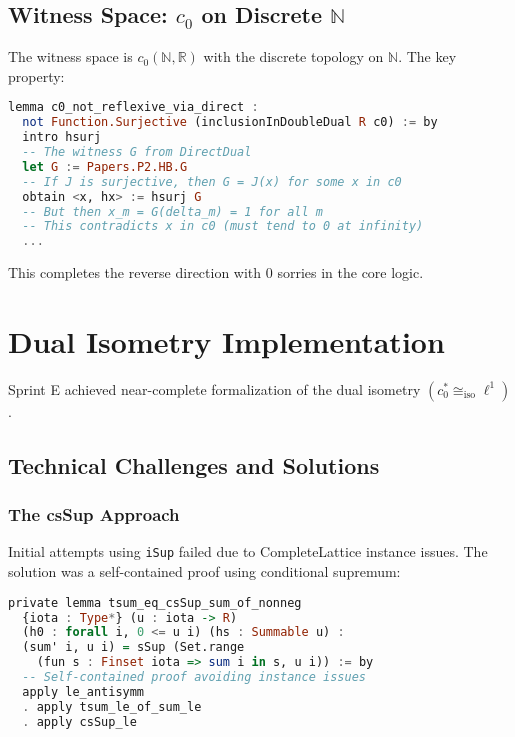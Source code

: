 \documentclass{lmcs}
\begin{document}
\subsection{Witness Space: $c_0$ on Discrete $\mathbb{N}$}

The witness space is $c_0(\mathbb{N}, \mathbb{R})$ with the discrete topology on $\mathbb{N}$. The key property:

\begin{lstlisting}[language=Haskell, caption={Non-reflexivity of $c_0$}]
lemma c0_not_reflexive_via_direct :
  not Function.Surjective (inclusionInDoubleDual R c0) := by
  intro hsurj
  -- The witness G from DirectDual
  let G := Papers.P2.HB.G
  -- If J is surjective, then G = J(x) for some x in c0
  obtain <x, hx> := hsurj G
  -- But then x_m = G(delta_m) = 1 for all m
  -- This contradicts x in c0 (must tend to 0 at infinity)
  ...
\end{lstlisting}

This completes the reverse direction with 0 sorries in the core logic.

\section{Dual Isometry Implementation}\label{sec:dual}

Sprint E achieved near-complete formalization of the dual isometry $(c_0^* \cong_{\mathrm{iso}} \ell^1)$.

\subsection{Technical Challenges and Solutions}

\subsubsection{The csSup Approach}

Initial attempts using \texttt{iSup} failed due to CompleteLattice instance issues. The solution was a self-contained proof using conditional supremum:

\begin{lstlisting}[language=Haskell, caption={Self-contained csSup approach}]
private lemma tsum_eq_csSup_sum_of_nonneg
  {iota : Type*} (u : iota -> R) 
  (h0 : forall i, 0 <= u i) (hs : Summable u) :
  (sum' i, u i) = sSup (Set.range 
    (fun s : Finset iota => sum i in s, u i)) := by
  -- Self-contained proof avoiding instance issues
  apply le_antisymm
  . apply tsum_le_of_sum_le
  . apply csSup_le
\end{lstlisting}
\end{document}
